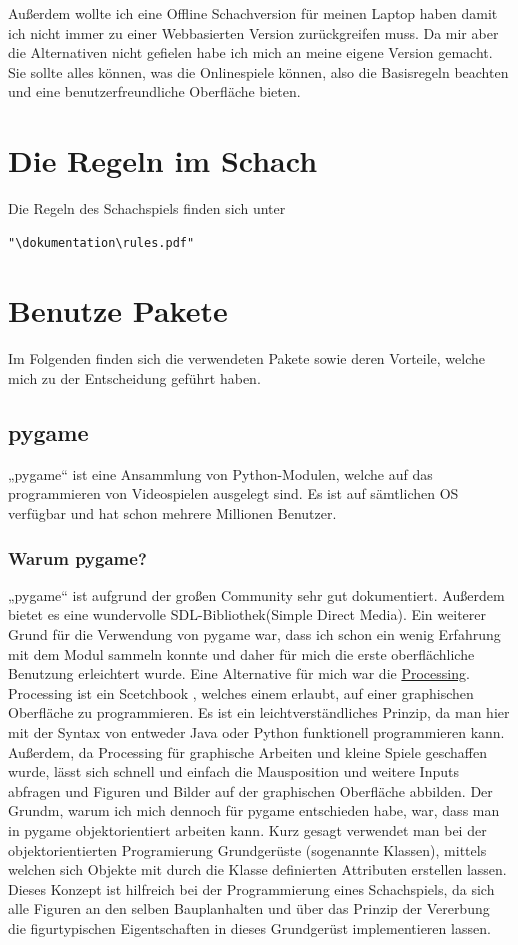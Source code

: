 \documentclass[a4paper, 10pt]{scrartcl}
\begin{document}
Außerdem wollte ich eine Offline Schachversion für meinen Laptop haben
damit ich nicht immer zu einer Webbasierten Version zurückgreifen muss. Da mir aber die
Alternativen nicht gefielen habe ich mich an meine eigene Version gemacht. Sie sollte
alles können, was die Onlinespiele können, also die Basisregeln beachten und eine benutzerfreundliche
Oberfläche bieten. 

\section{Die Regeln im Schach}
Die Regeln des Schachspiels finden sich unter \begin{verbatim}"\dokumentation\rules.pdf" \end{verbatim}

\section{Benutze Pakete}
Im Folgenden finden sich die verwendeten Pakete sowie deren Vorteile, welche mich zu der Entscheidung geführt haben.

\subsection{pygame}
„pygame“ ist eine Ansammlung von Python-Modulen, welche auf das programmieren von Videospielen ausgelegt sind. Es ist auf sämtlichen OS verfügbar und hat schon mehrere Millionen Benutzer.

\subsubsection{Warum pygame?}
„pygame“ ist aufgrund der großen Community sehr gut dokumentiert.
Außerdem bietet es eine wundervolle SDL-Bibliothek(Simple Direct Media).
Ein weiterer Grund für die Verwendung von pygame war, dass ich schon ein
wenig Erfahrung mit dem Modul sammeln konnte und daher für mich die erste
oberflächliche Benutzung erleichtert wurde.
Eine Alternative für mich war die \href{https://processing.org/}{Processing}.
Processing ist ein \glqq Scetchbook \grqq , welches einem erlaubt,
auf einer graphischen Oberfläche zu programmieren. Es ist ein leichtverständliches
Prinzip, da man hier mit der Syntax von entweder Java oder Python funktionell programmieren
kann. Außerdem, da Processing für graphische Arbeiten und kleine Spiele geschaffen wurde,
lässt sich schnell und einfach die Mausposition und weitere Inputs abfragen und
Figuren und Bilder auf der graphischen Oberfläche abbilden.
Der Grundm, warum ich mich dennoch für pygame entschieden habe, war, dass man in pygame
objektorientiert arbeiten kann. Kurz gesagt verwendet man bei der objektorientierten Programierung
Grundgerüste (sogenannte Klassen), mittels welchen sich Objekte mit durch die Klasse definierten Attributen
erstellen lassen. Dieses Konzept ist hilfreich bei der Programmierung eines Schachspiels,
da sich alle Figuren an den selben \glqq Bauplan\grqq  halten und über das Prinzip der Vererbung
die figurtypischen Eigentschaften in dieses Grundgerüst implementieren lassen.
\end{document}
